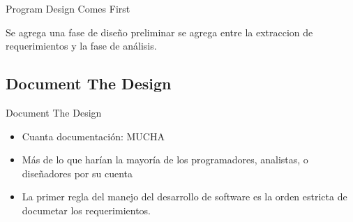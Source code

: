 \documentclass{beamer}
\begin{document}
\begin{frame}{Program Design Comes First}

Se agrega una fase de diseño preliminar se agrega entre la extraccion de requerimientos y la fase de análisis.



\end{frame}

\subsection{Document The Design}
\begin{frame}{Document The Design}

\begin{itemize}
\item Cuanta documentación: MUCHA
\item Más de lo que harían la mayoría de los programadores, analistas, o diseñadores por su cuenta
\item La primer regla del manejo del desarrollo de  software es la orden estricta de documetar los requerimientos.
\end{itemize}

\end{frame}
\end{document}

